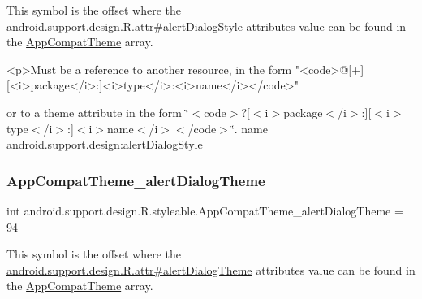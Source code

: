 This symbol is the offset where the \hyperlink{classandroid_1_1support_1_1design_1_1R_1_1attr_a6d4a8d67ca4397ec898ae4f527b4ea45}{android.\+support.\+design.\+R.\+attr\#alert\+Dialog\+Style} attribute\textquotesingle{}s value can be found in the \hyperlink{classandroid_1_1support_1_1design_1_1R_1_1styleable_afb351dc8de20cbd4c89abe360373010c}{App\+Compat\+Theme} array.

\begin{DoxyVerb}      <p>Must be a reference to another resource, in the form "<code>@[+][<i>package</i>:]<i>type</i>:<i>name</i></code>"
\end{DoxyVerb}
 or to a theme attribute in the form \char`\"{}$<$code$>$?\mbox{[}$<$i$>$package$<$/i$>$\+:\mbox{]}\mbox{[}$<$i$>$type$<$/i$>$\+:\mbox{]}$<$i$>$name$<$/i$>$$<$/code$>$\char`\"{}.  name android.\+support.\+design\+:alert\+Dialog\+Style \mbox{\label{classandroid_1_1support_1_1design_1_1R_1_1styleable_ab193347a11cc3f92c5815a51c851a4a6}} 
\subsubsection{\texorpdfstring{App\+Compat\+Theme\+\_\+alert\+Dialog\+Theme}{AppCompatTheme\_alertDialogTheme}}
{\footnotesize\ttfamily int android.\+support.\+design.\+R.\+styleable.\+App\+Compat\+Theme\+\_\+alert\+Dialog\+Theme = 94\hspace{0.3cm}{\ttfamily [static]}}

This symbol is the offset where the \hyperlink{classandroid_1_1support_1_1design_1_1R_1_1attr_a7654c30f567e69029288754a31b69125}{android.\+support.\+design.\+R.\+attr\#alert\+Dialog\+Theme} attribute\textquotesingle{}s value can be found in the \hyperlink{classandroid_1_1support_1_1design_1_1R_1_1styleable_afb351dc8de20cbd4c89abe360373010c}{App\+Compat\+Theme} array.

